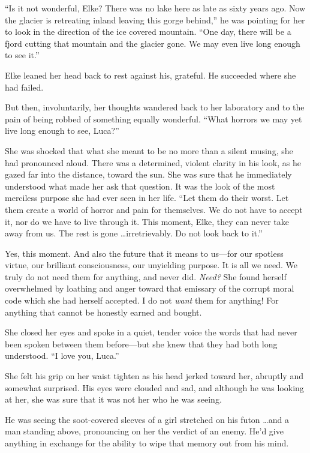 ``Is it not wonderful, Elke? There was no lake here as late as sixty years ago. Now the glacier is retreating inland leaving this gorge behind,'' he was pointing for her to look in the direction of the ice covered mountain. ``One day, there will be a fjord cutting that mountain and the glacier gone. We may even live long enough to see it.''

Elke leaned her head back to rest against his, grateful. He succeeded where she had failed.

But then, involuntarily, her thoughts wandered back to her laboratory and to the pain of being robbed of something equally wonderful. ``What horrors we may yet live long enough to see, Luca?''

She was shocked that what she meant to be no more than a silent musing, she had pronounced aloud. There was a determined, violent clarity in his look, as he gazed far into the distance, toward the sun. She was sure that he immediately understood what made her ask that question. It was the look of the most merciless purpose she had ever seen in her life. ``Let them do their worst. Let them create a world of horror and pain for themselves. We do not have to accept it, nor do we have to live through it. This moment, Elke, they can never take away from us. The rest is gone \ldots irretrievably. Do not look back to it.''

Yes, this moment. And also the future that it means to us---for our spotless virtue, our brilliant consciousness, our unyielding purpose. It is all we need. We truly do not need them for anything, and never did. \emph{Need?} She found herself overwhelmed by loathing and anger toward that emissary of the corrupt moral code which she had herself accepted. I do not \emph{want} them for anything! For anything that cannot be honestly earned and bought.

She closed her eyes and spoke in a quiet, tender voice the words that had never been spoken between them before---but she knew that they had both long understood. ``I love you, Luca.''

She felt his grip on her waist tighten as his head jerked toward her, abruptly and somewhat surprised. His eyes were clouded and sad, and although he was looking at her, she was sure that it was not her who he was seeing.

He was seeing the soot-covered sleeves of a girl stretched on his futon \ldots and a man standing above, pronouncing on her the verdict of an enemy. He'd give anything in exchange for the ability to wipe that memory out from his mind.


